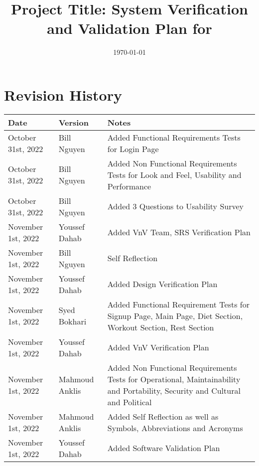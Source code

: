 \documentclass[12pt, titlepage]{article}
\begin{document}
\title{Project Title: System Verification and Validation Plan for \progname{}} 
\author{\authname}
\date{\today}

\maketitle


\section{Revision History}

\begin{tabularx}{\textwidth}{p{3cm}p{2cm}X}
	\toprule {\bf Date} & {\bf Version} & {\bf Notes}\\
	\midrule
	October 31st, 2022 & Bill Nguyen & Added Functional Requirements Tests for Login Page\\
	October 31st, 2022 & Bill Nguyen & Added Non Functional Requirements Tests for Look and Feel, Usability and Performance\\
	October 31st, 2022 & Bill Nguyen & Added 3 Questions to Usability Survey\\
	November 1st, 2022 & Youssef Dahab & Added VnV Team, SRS Verification Plan\\
	November 1st, 2022 & Bill Nguyen & Self Reflection\\
	November 1st, 2022 & Youssef Dahab & Added Design Verification Plan\\
	November 1st, 2022 & Syed Bokhari & Added Functional Requirement Tests for Signup Page, Main Page, Diet Section, Workout Section, Rest Section\\
	November 1st, 2022 & Youssef Dahab & Added VnV Verification Plan\\
	November 1st, 2022 & Mahmoud Anklis & Added Non Functional Requirements Tests for Operational, Maintainability and Portability, Security and Cultural and Political\\
	November 1st, 2022 & Mahmoud Anklis & Added Self Reflection as well as Symbols, Abbreviations and Acronyms\\
	November 1st, 2022 & Youssef Dahab & Added Software Validation Plan\\
	\bottomrule
\end{tabularx}

\newpage

\tableofcontents

\listoftables
{}
\end{document}
